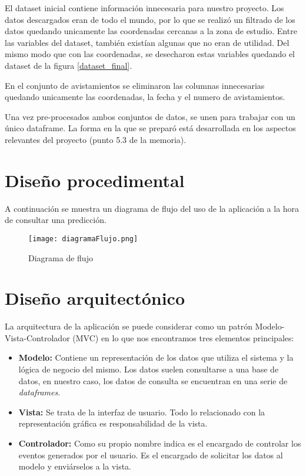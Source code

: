 El dataset inicial contiene información innecesaria para nuestro proyecto. Los datos descargados eran de todo el mundo, por lo que se realizó un filtrado de los datos quedando unicamente las coordenadas cercanas a la zona de estudio. Entre las variables del dataset, también existían algunas que no eran de utilidad. Del mismo modo que con las coordenadas, se desecharon estas variables quedando el dataset de la figura \ref{dataset_final}.

\label{dataset_final}

En el conjunto de avistamientos se eliminaron las columnas innecesarias quedando unicamente las coordenadas, la fecha y el numero de avistamientos.

Una vez pre-procesados ambos conjuntos de datos, se unen para trabajar con un único dataframe. La forma en la que se preparó está desarrollada en los aspectos relevantes del proyecto (punto 5.3 de la memoria).

\section{Diseño procedimental}

A continuación se muestra un diagrama de flujo del uso de la aplicación a la hora de consultar una predicción.

\begin{figure}[!h]
	\centering
	\texttt{[image: diagramaFlujo.png]}
	\caption{Diagrama de flujo}\label{fig:diagrama}
\end{figure}

\section{Diseño arquitectónico}

La arquitectura de la aplicación se puede considerar como un patrón Modelo-Vista-Controlador (MVC) \cite{mvc} en lo que nos encontramos tres elementos principales:

\begin{itemize}
	\item \textbf{Modelo:} Contiene un representación de los datos que utiliza el sistema y la lógica de negocio del mismo. Los datos suelen consultarse a una base de datos, en nuestro caso, los datos de consulta se encuentran en una serie de \emph{dataframes}.
	\item \textbf{Vista:} Se trata de la interfaz de usuario. Todo lo relacionado con la representación gráfica es responsabilidad de la vista.
	\item \textbf{Controlador:} Como su propio nombre indica es el encargado de controlar los eventos generados por el usuario. Es el encargado de solicitar los datos al modelo y enviárselos a la vista.
\end{itemize}

